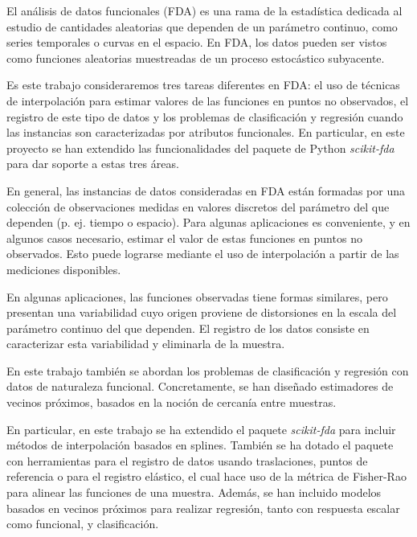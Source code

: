 El análisis de datos funcionales (FDA) es una rama de la estadística dedicada
al estudio de cantidades aleatorias que dependen de un parámetro continuo,
como series temporales o curvas en el espacio. En FDA, los datos pueden ser
vistos como funciones aleatorias muestreadas de un proceso
estocástico subyacente.

Es este trabajo consideraremos tres tareas diferentes en FDA:
el uso de técnicas de interpolación para estimar valores de las funciones
en puntos no observados,
el registro de este tipo de datos
y los problemas de clasificación y regresión cuando las instancias
son caracterizadas por atributos funcionales.
En particular, en este proyecto se han extendido las funcionalidades del
paquete de Python \textit{scikit-fda} para dar soporte a estas tres áreas.

En general, las instancias de datos consideradas en FDA están formadas por una
colección de observaciones medidas en valores discretos del parámetro del
que dependen (p. ej. tiempo o espacio).
Para algunas aplicaciones es conveniente, y en algunos casos necesario,
estimar el valor de estas funciones en puntos no observados.
Esto puede lograrse mediante el uso de interpolación a partir de las
mediciones disponibles.

En algunas aplicaciones, las funciones observadas tiene formas similares,
pero presentan una variabilidad cuyo origen proviene de
distorsiones en la escala del parámetro continuo del que
dependen. El registro de los datos consiste en caracterizar esta variabilidad
y eliminarla de la muestra.


En este trabajo también se abordan los problemas de clasificación y regresión
con datos de naturaleza funcional. Concretamente, se han diseñado
estimadores de vecinos próximos, basados en la noción de cercanía entre muestras.

En particular, en este trabajo se ha extendido el paquete \textit{scikit-fda}
para incluir métodos de interpolación basados en splines. También se ha dotado
el paquete con herramientas para el registro de datos usando traslaciones,
puntos de referencia o para el registro elástico, el cual hace uso
de la métrica de Fisher-Rao para alinear las funciones de una muestra.
Además, se han incluido modelos basados en vecinos próximos para realizar
regresión, tanto con respuesta escalar como funcional, y clasificación.
